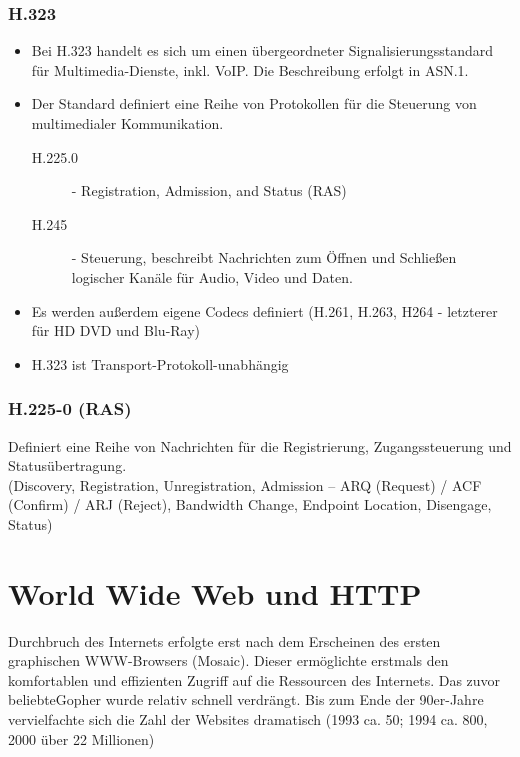 \documentclass{article} %
\begin{document}
\subsubsection{H.323}	
	\begin{itemize}
	\item Bei H.323 handelt es sich um einen übergeordneter Signalisierungsstandard für Multimedia-Dienste, inkl. VoIP. Die Beschreibung erfolgt in ASN.1.
	\item Der Standard definiert eine Reihe von Protokollen für die Steuerung von multimedialer Kommunikation.
		\begin{description}
		\item[H.225.0] - Registration, Admission, and Status (RAS)
		\item[H.245] -  Steuerung, beschreibt Nachrichten zum Öffnen und Schließen logischer Kanäle für Audio, Video und Daten. 
		\end{description}
	\item Es werden außerdem eigene Codecs definiert (H.261, H.263, H264 - letzterer für HD DVD und Blu-Ray)
	\item H.323 ist Transport-Protokoll-unabhängig
	\end{itemize}
	
\subsubsection{H.225-0 (RAS)}
Definiert eine Reihe von Nachrichten für die Registrierung, Zugangssteuerung und Statusübertragung. \\
(Discovery, Registration, Unregistration, Admission – ARQ (Request) / ACF (Confirm) / ARJ (Reject), Bandwidth Change, Endpoint Location, Disengage, Status)



\section{World Wide Web und HTTP}

Durchbruch des Internets erfolgte erst nach dem Erscheinen des ersten graphischen WWW-Browsers (\glqq Mosaic\grqq).
Dieser ermöglichte erstmals den komfortablen und effizienten Zugriff auf die Ressourcen des Internets.
Das zuvor \glqq beliebte\grqq{\ }Gopher wurde relativ schnell verdrängt.
Bis zum Ende der 90er-Jahre vervielfachte sich die Zahl der Websites dramatisch (1993 ca. 50; 1994 ca. 800, 2000 über 22 Millionen)
\end{document}
